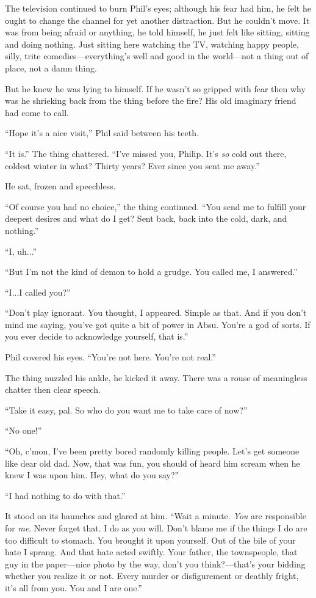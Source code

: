 The television continued to burn Phil's eyes; although his fear had him,
he felt he ought to change the channel for yet another distraction. But
he couldn't move. It was from being afraid or anything, he told himself,
he just felt like sitting, sitting and doing nothing. Just sitting here
watching the TV, watching happy people, silly, trite
comedies---everything's well and good in the world---not a thing out of
place, not a damn thing.

But he knew he was lying to himself. If he wasn't so gripped with fear
then why was he shrieking back from the thing before the fire? His old
imaginary friend had come to call.

``Hope it's a nice visit,'' Phil said between his teeth.

``It is.'' The thing chattered. ``I've missed you, Philip. It's
\emph{so} cold out there, coldest winter in what? Thirty years? Ever
since you sent me away.''

He sat, frozen and speechless.

``Of course you had no choice,'' the thing continued. ``You send me to
fulfill your deepest desires and what do I get? Sent back, back into the
cold, dark, and nothing.''

``I, uh...''

``But I'm not the kind of demon to hold a grudge. You called me, I
answered.''

``I...I called you?''

``Don't play ignorant. You thought, I appeared. Simple as that. And if
you don't mind me saying, you've got quite a bit of power in Absu.
You're a god of sorts. If you ever decide to acknowledge yourself, that
is.''

Phil covered his eyes. ``You're not here. You're not real.''

The thing nuzzled his ankle, he kicked it away. There was a rouse of
meaningless chatter then clear speech.

``Take it easy, pal. So who do you want me to take care of now?''

``No one!''

``Oh, c'mon, I've been pretty bored randomly killing people. Let's get
someone like dear old dad. Now, that was fun, you should of heard him
scream when he knew I was upon him. Hey, what do you say?''

``I had nothing to do with that.''

It stood on its haunches and glared at him. ``Wait a minute. \emph{You}
are responsible for \emph{me}. Never forget that. I do as you will.
Don't blame me if the things I do are too difficult to stomach. You
brought it upon yourself. Out of the bile of your hate I sprang. And
that hate acted swiftly. Your father, the townspeople, that guy in the
paper---nice photo by the way, don't you think?---that's your bidding
whether you realize it or not. Every murder or disfigurement or deathly
fright, it's all from you. You and I are one.''

